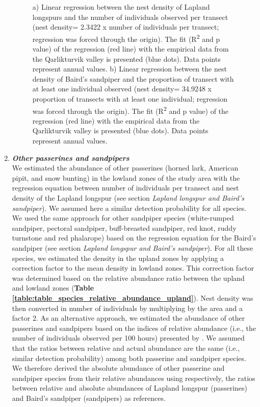 \documentclass[a4paper,twoside,12pt]{article}
\begin{document}
\begin{enumerate}[label=\alph*.]
\begin{figure}[H]
\begin{subfigure}{0.5\textwidth}
                \caption{}
                \end{subfigure}
                \caption{a) Linear regression between the nest density of Lapland longspurs and the number of individuals observed per transect (nest density= 2.3422 x number of individuals per transect; regression was forced through the origin). The fit (R\textsuperscript{2} and p value) of the regression (red line) with the empirical data from the Qarlikturvik valley is presented (blue dots). Data points represent annual values. b) Linear regression between the nest density of Baird’s sandpiper and the proportion of transect with at least one individual observed (nest density= 34.9248 x proportion of transects with at least one individual; regression was forced through the origin). The fit (R\textsuperscript{2} and p value) of the regression (red line) with the empirical data from the Qarlikturvik valley is presented (blue dots). Data points represent annual values.}
                \label{figure:lalo_basa}
                \end{figure} 
                
                \item[] \textit{\textbf{Other passerines and sandpipers}}\\
                We estimated the abundance of other passerines (horned lark, American pipit, and snow bunting) in the lowland zones of the study area with the regression equation between number of individuals per transect and nest density of the Lapland longspur (see section \textit{Lapland longspur and Baird’s sandpiper}). We assumed here a similar detection probability for all species. We used the same approach for other sandpiper species (white-rumped sandpiper, pectoral sandpiper, buff-breasted sandpiper, red knot, ruddy turnstone and red phalarope) based on the regression equation for the Baird's sandpiper (see section \textit{Lapland longspur and Baird’s sandpiper}). For all these species, we estimated the density in the upland zones by applying a correction factor to the mean density in lowland zones. This correction factor was determined based on the relative abundance ratio between the upland and lowland zones (\textbf{Table \ref{table:table_species_relative_abundance_upland}}). Nest density was then converted in number of individuals by multiplying by the area and a factor 2.
As an alternative approach, we estimated the abundance of other passerines and sandpipers based on the indices of relative abundance (i.e., the number of individuals observed per 100 hours) presented by \citet{gauthier2024a}. We assumed that the ratios between relative and actual abundance are the same (i.e., similar detection probability) among both passerine and sandpiper species. We therefore derived the absolute abundance of other passerine and sandpiper species from their relative abundances using respectively, the ratios between relative and absolute abundances of Lapland longspur (passerines) and Baird’s sandpiper (sandpipers) as references.


\end{enumerate}
\end{document}
